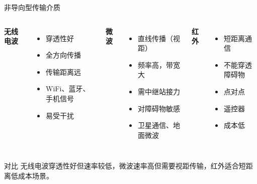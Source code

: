 \documentclass[10pt, aspectratio=169]{beamer}
\begin{document}
\begin{frame}{非导向型传输介质}
    \begin{columns}[T]
        \textbf{无线电波}
        \begin{itemize}
            \item 穿透性好
            \item 全方向传播
            \item 传输距离远
            \item WiFi、蓝牙、手机信号
            \item 易受干扰
        \end{itemize}
        \textbf{微波}
        \begin{itemize}
            \item 直线传播（视距）
            \item 频率高，带宽大
            \item 需中继站接力
            \item 对障碍物敏感
            \item 卫星通信、地面微波
        \end{itemize}
        \textbf{红外}
        \begin{itemize}
            \item 短距离通信
            \item 不能穿透障碍物
            \item 点对点
            \item 遥控器
            \item 成本低
        \end{itemize}
    \end{columns}
    \vspace{0.5em}
    \begin{block}{对比}
        无线电波穿透性好但速率较低，微波速率高但需要视距传输，红外适合短距离低成本场景。
    \end{block}
\end{frame}
\end{document}
